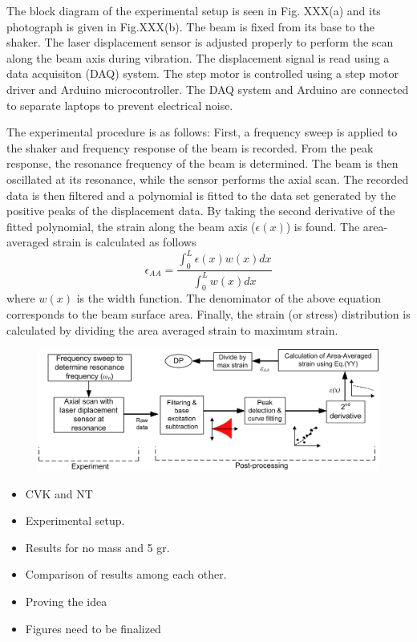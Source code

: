 \documentclass{article}
\begin{document}
The block diagram of the experimental setup is seen in Fig. XXX(a) and its photograph is given in  Fig.XXX(b). The beam is fixed from its base to the shaker. The laser displacement sensor is adjusted properly to perform the scan along the beam axis during vibration. The displacement signal is read using a data acquisiton (DAQ) system. The step motor is controlled using a step motor driver and Arduino microcontroller. The DAQ system and Arduino are connected to separate laptops to prevent electrical noise.

The experimental procedure is as follows: First, a frequency sweep is applied to the shaker and frequency response of the beam is recorded. From the peak response, the resonance frequency of the beam is determined. The beam is then oscillated at its resonance, while the sensor performs the axial scan. The recorded data is then filtered and a polynomial is fitted to the data set generated by the positive peaks of the displacement data.
By taking the second derivative of the fitted polynomial, the strain along the beam axis ($\epsilon(x)$) is found. The area-averaged strain is calculated as follows
\begin{equation}
\epsilon_{AA} = \frac{\int_{0}^{L}\epsilon \left ( x \right ) w\left ( x \right ) dx}{\int_{0}^{L} w\left ( x \right ) dx}
\end{equation}
where $w(x)$ is the width function. The denominator of the above equation corresponds to the beam surface area. Finally, the strain (or stress) distribution is calculated by dividing the area averaged strain to maximum strain.

\begin{figure}[ht!]
\centering
\includegraphics[width=120mm]{figures/exp_proc.png}
\caption{ \label{overflow}}
\end{figure}


\begin{itemize}
    \item CVK and NT
    \item Experimental setup.
    \item Results for no mass and 5 gr.
    \item Comparison of results among each other.
    \item Proving the idea
    \item Figures need to be finalized


\end{itemize}
\end{document}
